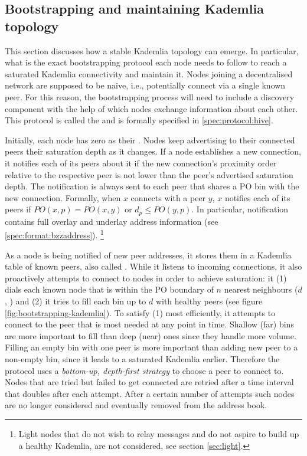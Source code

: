 \subsection{Bootstrapping and maintaining Kademlia topology}\label{sec:bootstrapping}
 
This  section discusses how a stable Kademlia topology  can emerge. In particular, what is the exact bootstrapping protocol each node needs to follow to reach a saturated Kademlia connectivity and maintain it. Nodes joining a decentralised network are supposed to be  naive, i.e., potentially connect via a single known peer. For this reason, the bootstrapping process  will need to include a discovery component with the help of which nodes exchange information about each other. This protocol is called the  and is formally specified in \ref{spec:protocol:hive}.

Initially, each node has zero as their . Nodes keep advertising to their connected peers their saturation depth as it changes. If a node establishes a new connection, it notifies each of its peers about it if the new connection's proximity order relative to the respective peer is not lower than the peer's advertised saturation depth. The notification is always sent to each peer that shares a PO bin with the new connection. Formally, when $x$ connects with a peer $y$, $x$ notifies each of its peers if $\mathit{PO}(x, p) = \mathit{PO}(x, y)$ or $d_p\leq \mathit{PO}(y, p)$. In particular, notification contains  full overlay and underlay address information (see \ref{spec:format:bzzaddress}).%
%
\footnote{Light nodes that do not wish to relay messages and do not aspire to build up a healthy Kademlia, are not considered, see section \ref{sec:light}. }

As a node is being notified of new peer addresses, it stores them in a Kademlia table of known peers, also called . While it listens to incoming connections, it also proactively attempts to connect to nodes in order to achieve saturation: it (1) dials each known node that is within the PO boundary of $n$ nearest neighbours ($d$, ) and (2) it tries to fill each bin up to $d$ with healthy peers (see figure \ref{fig:bootstrapping-kademlia}). To satisfy (1) most efficiently, it attempts to connect to the peer that is most needed at any point in time. Shallow (far) bins are more important to fill than deep (near) ones since they handle more volume. Filling an empty bin with one peer is more important than adding new peer to a non-empty bin, since it leads to a saturated Kademlia earlier. Therefore the protocol uses a \emph{bottom-up, depth-first strategy} to choose a peer to connect to.  Nodes that are tried but failed to get connected are retried after a time interval that doubles after each attempt. After a certain number of attempts such nodes are no longer considered and eventually removed from the address book.


